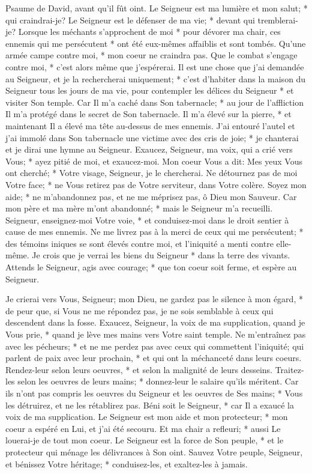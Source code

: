 Psaume de David, avant qu'il fût oint. Le Seigneur est ma lumière et mon salut; * qui craindrai-je? Le Seigneur est le défenser de ma vie; * devant qui tremblerai-je?
Lorsque les méchants s'approchent de moi * pour dévorer ma chair, ces ennemis qui me persécutent * ont été eux-mêmes affaiblis et sont tombés.
Qu'une armée campe contre moi, * mon coeur ne craindra pas. Que le combat s'engage contre moi, * c'est alors même que j'espérerai.
Il est une chose que j'ai demandée au Seigneur, et je la rechercherai uniquement; * c'est d'habiter dans la maison du Seigneur tous les jours de ma vie, pour contempler les délices du Seigneur * et visiter Son temple.
Car Il m'a caché dans Son tabernacle; * au jour de l'affliction Il m'a protégé dans le secret de Son tabernacle.
Il m'a élevé sur la pierre, * et maintenant Il a élevé ma tête au-dessus de mes ennemis. J'ai entouré l'autel et j'ai immolé dans Son tabernacle une victime avec des cris de joie; * je chanterai et je dirai une hymne au Seigneur.
Exaucez, Seigneur, ma voix, qui a crié vers Vous; * ayez pitié de moi, et exaucez-moi.
Mon coeur Vous a dit: Mes yeux Vous ont cherché; * Votre visage, Seigneur, je le chercherai.
Ne détournez pas de moi Votre face; * ne Vous retirez pas de Votre serviteur, dans Votre colère. Soyez mon aide; * ne m'abandonnez pas, et ne me méprisez pas, ô Dieu mon Sauveur.
Car mon père et ma mère m'ont abandonné; * mais le Seigneur m'a recueilli.
Seigneur, enseignez-moi Votre voie, * et conduisez-moi dans le droit sentier à cause de mes ennemis.
Ne me livrez pas à la merci de ceux qui me persécutent; * des témoins iniques se sont élevés contre moi, et l'iniquité a menti contre elle-même.
Je crois que je verrai les biens du Seigneur * dans la terre des vivants.
Attends le Seigneur, agis avec courage; * que ton coeur soit ferme, et espère au Seigneur.

Je crierai vers Vous, Seigneur; mon Dieu, ne gardez pas le silence à mon égard, * de peur que, si Vous ne me répondez pas, je ne sois semblable à ceux qui descendent dans la fosse.
Exaucez, Seigneur, la voix de ma supplication, quand je Vous prie, * quand je lève mes mains vers Votre saint temple.
Ne m'entraînez pas avec les pécheurs; * et ne me perdez pas avec ceux qui commettent l'iniquité; qui parlent de paix avec leur prochain, * et qui ont la méchanceté dans leurs coeurs.
Rendez-leur selon leurs oeuvres, * et selon la malignité de leurs desseins. Traitez-les selon les oeuvres de leurs mains; * donnez-leur le salaire qu'ils méritent.
Car ils n'ont pas compris les oeuvres du Seigneur et les oeuvres de Ses mains; * Vous les détruirez, et ne les rétablirez pas.
Béni soit le Seigneur, * car Il a exaucé la voix de ma supplication.
Le Seigneur est mon aide et mon protecteur; * mon coeur a espéré en Lui, et j'ai été secouru. Et ma chair a refleuri; * aussi Le louerai-je de tout mon coeur.
Le Seigneur est la force de Son peuple, * et le protecteur qui ménage les délivrances à Son oint.
Sauvez Votre peuple, Seigneur, et bénissez Votre héritage; * conduisez-les, et exaltez-les à jamais.

